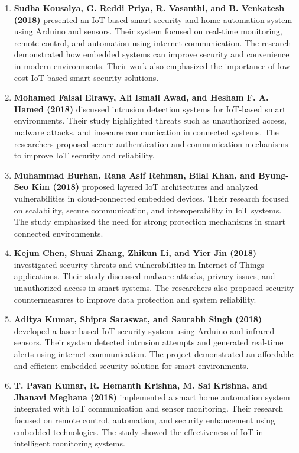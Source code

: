 \documentclass[conference]{IEEEtran}
\begin{document}
\begin{enumerate}

\item \textbf{Sudha Kousalya, G. Reddi Priya, R. Vasanthi, and B. Venkatesh (2018)} presented an IoT-based smart security and home automation system using Arduino and sensors. Their system focused on real-time monitoring, remote control, and automation using internet communication. The research demonstrated how embedded systems can improve security and convenience in modern environments. Their work also emphasized the importance of low-cost IoT-based smart security solutions.

\item \textbf{Mohamed Faisal Elrawy, Ali Ismail Awad, and Hesham F. A. Hamed (2018)} discussed intrusion detection systems for IoT-based smart environments. Their study highlighted threats such as unauthorized access, malware attacks, and insecure communication in connected systems. The researchers proposed secure authentication and communication mechanisms to improve IoT security and reliability.

\item \textbf{Muhammad Burhan, Rana Asif Rehman, Bilal Khan, and Byung-Seo Kim (2018)} proposed layered IoT architectures and analyzed vulnerabilities in cloud-connected embedded devices. Their research focused on scalability, secure communication, and interoperability in IoT systems. The study emphasized the need for strong protection mechanisms in smart connected environments.

\item \textbf{Kejun Chen, Shuai Zhang, Zhikun Li, and Yier Jin (2018)} investigated security threats and vulnerabilities in Internet of Things applications. Their study discussed malware attacks, privacy issues, and unauthorized access in smart systems. The researchers also proposed security countermeasures to improve data protection and system reliability.

\item \textbf{Aditya Kumar, Shipra Saraswat, and Saurabh Singh (2018)} developed a laser-based IoT security system using Arduino and infrared sensors. Their system detected intrusion attempts and generated real-time alerts using internet communication. The project demonstrated an affordable and efficient embedded security solution for smart environments.

\item \textbf{T. Pavan Kumar, R. Hemanth Krishna, M. Sai Krishna, and Jhanavi Meghana (2018)} implemented a smart home automation system integrated with IoT communication and sensor monitoring. Their research focused on remote control, automation, and security enhancement using embedded technologies. The study showed the effectiveness of IoT in intelligent monitoring systems.


\end{enumerate}
\end{document}
